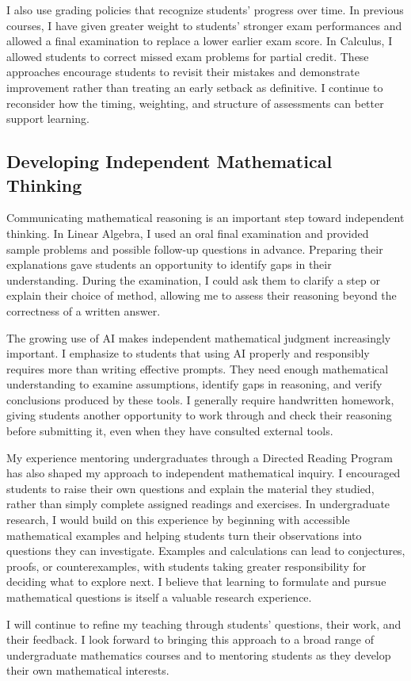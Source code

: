 \documentclass[11pt]{article}
\begin{document}
I also use grading policies that recognize students' progress over time. In previous courses, I have given greater weight to students' stronger exam performances and allowed a final examination to replace a lower earlier exam score. In Calculus, I allowed students to correct missed exam problems for partial credit. These approaches encourage students to revisit their mistakes and demonstrate improvement rather than treating an early setback as definitive. I continue to reconsider how the timing, weighting, and structure of assessments can better support learning.

\subsection*{Developing Independent Mathematical Thinking}
Communicating mathematical reasoning is an important step toward independent thinking. In Linear Algebra, I used an oral final examination and provided sample problems and possible follow-up questions in advance. Preparing their explanations gave students an opportunity to identify gaps in their understanding. During the examination, I could ask them to clarify a step or explain their choice of method, allowing me to assess their reasoning beyond the correctness of a written answer.

The growing use of AI makes independent mathematical judgment increasingly important. I emphasize to students that using AI properly and responsibly requires more than writing effective prompts. They need enough mathematical understanding to examine assumptions, identify gaps in reasoning, and verify conclusions produced by these tools. I generally require handwritten homework, giving students another opportunity to work through and check their reasoning before submitting it, even when they have consulted external tools.

My experience mentoring undergraduates through a Directed Reading Program has also shaped my approach to independent mathematical inquiry. I encouraged students to raise their own questions and explain the material they studied, rather than simply complete assigned readings and exercises. In undergraduate research, I would build on this experience by beginning with accessible mathematical examples and helping students turn their observations into questions they can investigate. Examples and calculations can lead to conjectures, proofs, or counterexamples, with students taking greater responsibility for deciding what to explore next. I believe that learning to formulate and pursue mathematical questions is itself a valuable research experience.

I will continue to refine my teaching through students' questions, their work, and their feedback. I look forward to bringing this approach to a broad range of undergraduate mathematics courses and to mentoring students as they develop their own mathematical interests.
\end{document}
